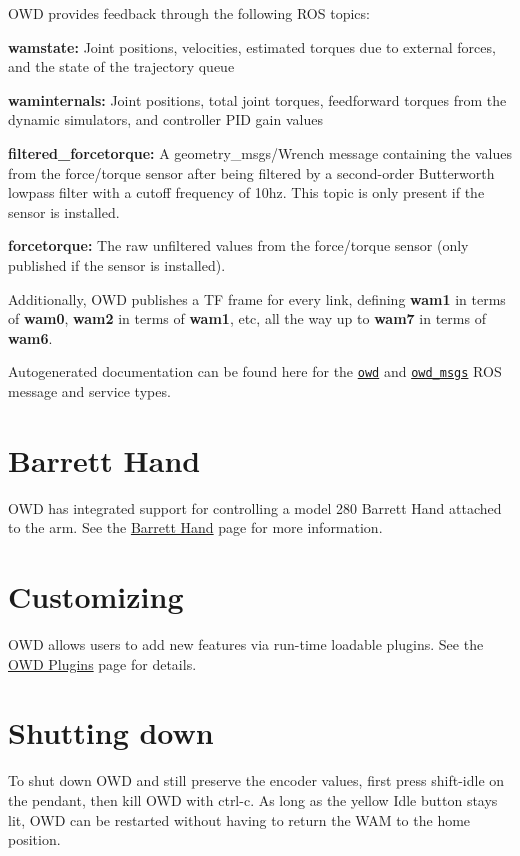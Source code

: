 O\-W\-D provides feedback through the following R\-O\-S topics\-:


\begin{DoxyItemize}
\item {\bfseries wamstate\-:} Joint positions, velocities, estimated torques due to external forces, and the state of the trajectory queue
\item {\bfseries waminternals\-:} Joint positions, total joint torques, feedforward torques from the dynamic simulators, and controller P\-I\-D gain values
\item {\bfseries filtered\-\_\-forcetorque\-:} A geometry\-\_\-msgs/\-Wrench message containing the values from the force/torque sensor after being filtered by a second-\/order Butterworth lowpass filter with a cutoff frequency of 10hz. This topic is only present if the sensor is installed.
\item {\bfseries forcetorque\-:} The raw unfiltered values from the force/torque sensor (only published if the sensor is installed).
\end{DoxyItemize}

Additionally, O\-W\-D publishes a T\-F frame for every link, defining {\bfseries wam1} in terms of {\bfseries wam0}, {\bfseries wam2} in terms of {\bfseries wam1}, etc, all the way up to {\bfseries wam7} in terms of {\bfseries wam6}.

Autogenerated documentation can be found here for the \href{http://personalrobotics.ri.cmu.edu/pr-ros-pkg/owd/html/index-msg.html}{\tt owd} and \href{http://personalrobotics.ri.cmu.edu/pr-ros-pkg/owd_msgs/html/index-msg.html}{\tt owd\-\_\-msgs} R\-O\-S message and service types.\hypertarget{index_barretthand}{}\section{Barrett Hand}\label{index_barretthand}
O\-W\-D has integrated support for controlling a model 280 Barrett Hand attached to the arm. See the \hyperlink{bhand}{Barrett Hand} page for more information.\hypertarget{index_customizing}{}\section{Customizing}\label{index_customizing}
O\-W\-D allows users to add new features via run-\/time loadable plugins. See the \hyperlink{plugins}{O\-W\-D Plugins} page for details.\hypertarget{index_shutdown}{}\section{Shutting down}\label{index_shutdown}
To shut down O\-W\-D and still preserve the encoder values, first press shift-\/idle on the pendant, then kill O\-W\-D with ctrl-\/c. As long as the yellow Idle button stays lit, O\-W\-D can be restarted without having to return the W\-A\-M to the home position.

